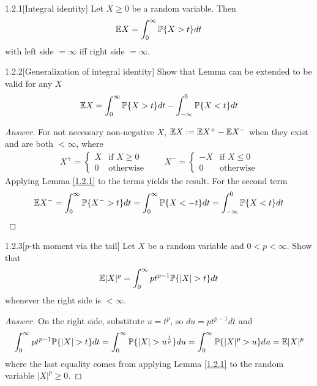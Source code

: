 \begin{lemma}{1.2.1}[Integral identity]\label{1.2.1}
Let $X\geq0$ be a random variable. Then 
\begin{align*}
    \mathbb{E} X = \int^\infty_0\mathbb{P}\{X>t\}dt
\end{align*}
with left side $=\infty$ iff right side $=\infty$.
\end{lemma}

\begin{ex}{1.2.2}[Generalization of integral identity]\label{1.2.2}
Show that Lemma  can be extended to be valid for any $X$
\begin{align*}
    \mathbb{E} X = \int^\infty_0 \mathbb{P}\{X >t\} dt - \int^0_{-\infty} \mathbb{P}\{X < t\} dt
\end{align*}
\end{ex}
\begin{proof}[Answer]
For not necessary non-negative $X$, $\mathbb{E} X := \mathbb{E} X^+ - \mathbb{E} X^-$ when they exist and are both $< \infty$, where
\begin{align*}
    X^+ = \begin{cases}
            X &\text{if } X\geq0 \\
            0 &\text{otherwise}
    \end{cases}\qquad
    X^- = \begin{cases}
            -X &\text{if } X\leq0 \\
            0 &\text{otherwise}
    \end{cases}
\end{align*}
Applying Lemma \ref{1.2.1} to the terms yields the result. For the second term
\begin{align*}
    \mathbb{E} X^- = \int^\infty_0 \mathbb{P}\{X^- > t\} dt = \int^\infty_0\mathbb{P}\{X < -t\} dt = \int^0_{-\infty}\mathbb{P}\{X < t\} dt
\end{align*}
\end{proof}

\begin{ex}{1.2.3}[$p$-th moment via the tail]\label{1.2.3}
Let $X$ be a random variable and $0 < p < \infty$. Show that
\begin{align*}
    \E |X|^p = \int^\infty_0 pt^{p-1}\P\{|X|>t\} dt
\end{align*}
whenever the right side is $<\infty$.
\end{ex}
\begin{proof}[Answer]
On the right side, substitute $u = t^p$, so $du = pt^{p-1} dt$ and
\begin{align*}
    \int^\infty_0 pt^{p-1}\P\{|X|>t\} dt = \int^\infty_0 \P\{|X|>u^{\frac1p}\} du = \int^\infty_0 \P\{|X|^p>u\} du = \E |X|^p
\end{align*}
where the last equality comes from applying Lemma \ref{1.2.1} to the random variable $|X|^p \geq 0$.
\end{proof}

